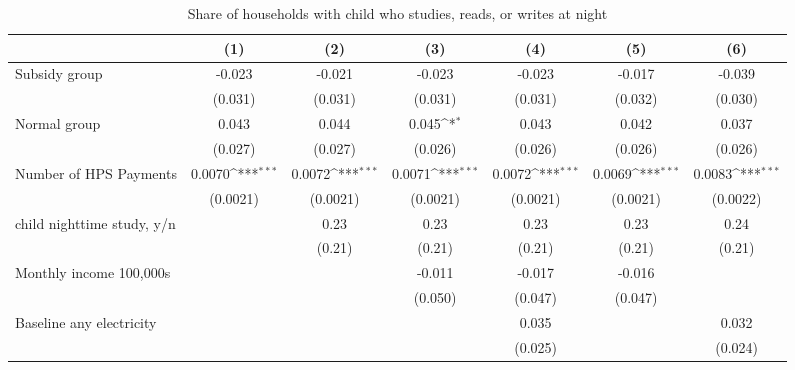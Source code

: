 \begin{table}[htbp]\centering
\def\sym#1{\ifmmode^{#1}\else\(^{#1}\)\fi}
\caption{Share of households with child who studies, reads, or writes at night}
\begin{tabular*}{1\hsize}{@{\hskip\tabcolsep\extracolsep\fill}l*{6}{c}}
\toprule
                &\multicolumn{1}{c}{(1)}         &\multicolumn{1}{c}{(2)}         &\multicolumn{1}{c}{(3)}         &\multicolumn{1}{c}{(4)}         &\multicolumn{1}{c}{(5)}         &\multicolumn{1}{c}{(6)}         \\
\midrule
Subsidy group   &   -0.023         &   -0.021         &   -0.023         &   -0.023         &   -0.017         &   -0.039         \\
                &  (0.031)         &  (0.031)         &  (0.031)         &  (0.031)         &  (0.032)         &  (0.030)         \\
Normal group    &    0.043         &    0.044         &    0.045\sym{*}  &    0.043         &    0.042         &    0.037         \\
                &  (0.027)         &  (0.027)         &  (0.026)         &  (0.026)         &  (0.026)         &  (0.026)         \\
Number of HPS Payments&   0.0070\sym{***}&   0.0072\sym{***}&   0.0071\sym{***}&   0.0072\sym{***}&   0.0069\sym{***}&   0.0083\sym{***}\\
                & (0.0021)         & (0.0021)         & (0.0021)         & (0.0021)         & (0.0021)         & (0.0022)         \\
child nighttime study, y/n&                  &     0.23         &     0.23         &     0.23         &     0.23         &     0.24         \\
                &                  &   (0.21)         &   (0.21)         &   (0.21)         &   (0.21)         &   (0.21)         \\
Monthly income 100,000s&                  &                  &   -0.011         &   -0.017         &   -0.016         &                  \\
                &                  &                  &  (0.050)         &  (0.047)         &  (0.047)         &                  \\
Baseline any electricity&                  &                  &                  &    0.035         &                  &    0.032         \\
                &                  &                  &                  &  (0.025)         &                  &  (0.024)         \\

\end{tabular*}
\end{table}
